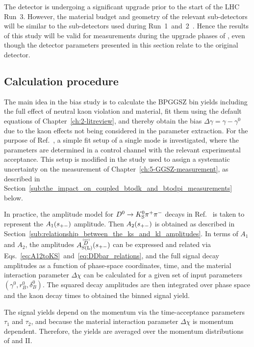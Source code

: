The \lhcb detector is undergoing a significant upgrade prior to the start of the LHC Run~3. However, the material budget and geometry of the relevant sub-detectors will be similar to the sub-detectors used during Run~1~and~2~\cite{VELOUpgradeTDR,PIDUpgradeTDR}. Hence the results of this study will be valid for measurements during the upgrade phases of \lhcb, even though the detector parameters presented in this section relate to the original \lhcb detector.


\subsection{Calculation procedure} %
\label{sub:calculation_procedure}

The main idea in the bias study is to calculate the BPGGSZ bin yields including the full effect of neutral kaon \CP violation and material, fit them using the default equations of Chapter~\ref{ch:2-litreview}, and thereby obtain the bias $\Delta\gamma = \gamma - \gamma^0$ due to the kaon effects not being considered in the parameter extraction. For the purpose of Ref.~\cite{KsCPV}, a simple fit setup of a single \BtoDh mode is investigated, where the \Ki parameters are determined in a control channel with the relevant experimental acceptance. This setup is modified in the study used to assign a systematic uncertainty on the \lhcb measurement of Chapter~\ref{ch:5-GGSZ-measurement}, as described in Section~\ref{sub:the_impact_on_coupled_btodk_and_btodpi_measurements} below.


In practice, the amplitude model for ${{D}^0}\rightarrow{\ensuremath{{K}^0_{\mathrm{S}}}}{\ensuremath{{\pi}^+}}{\ensuremath{{\pi}^-}}$ decays in Ref.~\cite{Belle2018} is taken to represent the $A_1(s_{+-})$ amplitude. Then $A_2(s_{+-})$ is obtained as described in Section~\ref{sub:relationship_between_the_ks_and_kl_amplitudes}. In terms of $A_1$ and $A_2$, the amplitudes $\ADorDbSL(\spm)$ can be expressed and related via Eqs.~\eqref{eq:A12toKS}~and~\eqref{eq:DDbar_relations}, and the full signal decay amplitudes as a function of phase-space coordinates, time, and the material interaction parameter $\Delta\chi$ can be calculated for a given set of input parameters $(\gamma^0, r_B^0, \delta_B^0)$. The squared decay amplitudes are then integrated over phase space and the kaon decay times to obtained the binned signal yield.

The signal yields depend on the momentum via the time-acceptance parameters $\tau_1$ and $\tau_2$, and because the material interaction parameter $\Delta\chi$ is momentum dependent. Therefore, the yields are averaged over the \KS momentum distributions of \lhcb and \belle II. 


